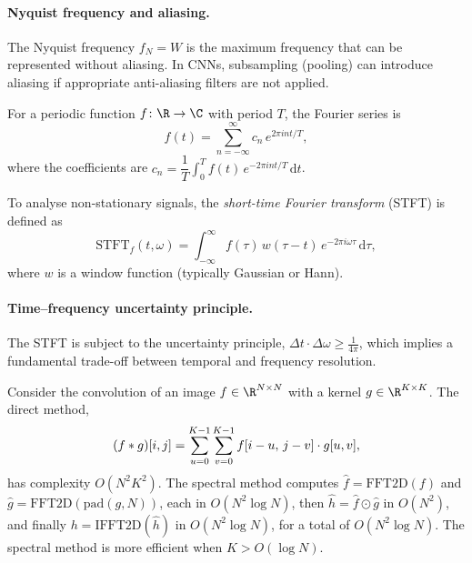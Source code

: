 \paragraph{Nyquist frequency and aliasing.}
The Nyquist frequency $f_N = W$ is the maximum frequency that can be represented
without aliasing. In CNNs, subsampling (pooling) can introduce aliasing if
appropriate anti-aliasing filters are not applied.

\begin{definition}
\label{def:grids:fourier-series}
For a periodic function $f \colon \R \to \C$ with period $T$, the Fourier series
is
\[
  f(t) = \sum_{n=-\infty}^{\infty} c_n\, e^{2\pi i n t/T},
\]
where the coefficients are $c_n = \dfrac{1}{T} \int_0^T f(t)\, e^{-2\pi i n t/T}\, \mathrm{d}t$.
\end{definition}

\begin{definition}
\label{def:grids:stft}
To analyse non-stationary signals, the \emph{short-time Fourier transform}
(STFT) is defined as
\[
  \mathrm{STFT}_f(t, \omega)
   = \int_{-\infty}^{\infty} f(\tau)\, w(\tau - t)\, e^{-2\pi i \omega \tau}\, \mathrm{d}\tau,
\]
where $w$ is a window function (typically Gaussian or Hann).
\end{definition}

\paragraph{Time--frequency uncertainty principle.}
The STFT is subject to the uncertainty principle,
$\Delta t \cdot \Delta \omega \geq \frac{1}{4\pi}$, which implies a fundamental
trade-off between temporal and frequency resolution.

\begin{example}
\label{ex:grids:fft-complexity}
Consider the convolution of an image $f \in \R^{N \times N}$ with a kernel
$g \in \R^{K \times K}$. The direct method,
\[
  (f * g)[i,j] = \sum_{u=0}^{K-1} \sum_{v=0}^{K-1} f[i-u,\, j-v] \cdot g[u,v],
\]
has complexity $O(N^2 K^2)$. The spectral method computes
$\hat{f} = \mathrm{FFT2D}(f)$ and $\hat{g} = \mathrm{FFT2D}(\mathrm{pad}(g,N))$,
each in $O(N^2 \log N)$, then $\hat{h} = \hat{f} \odot \hat{g}$ in $O(N^2)$, and
finally $h = \mathrm{IFFT2D}(\hat{h})$ in $O(N^2 \log N)$, for a total of
$O(N^2 \log N)$. The spectral method is more efficient when $K > O(\log N)$.
\end{example}

